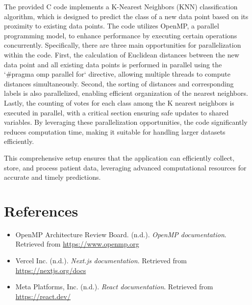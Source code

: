 \documentclass[a4paper,12pt]{report}
\begin{document}
The provided C code implements a K-Nearest Neighbors (KNN) classification algorithm, which is designed to predict the class of a new data point based on its proximity to existing data points. The code utilizes OpenMP, a parallel programming model, to enhance performance by executing certain operations concurrently. Specifically, there are three main opportunities for parallelization within the code. First, the calculation of Euclidean distances between the new data point and all existing data points is performed in parallel using the `\#pragma omp parallel for` directive, allowing multiple threads to compute distances simultaneously. Second, the sorting of distances and corresponding labels is also parallelized, enabling efficient organization of the nearest neighbors. Lastly, the counting of votes for each class among the K nearest neighbors is executed in parallel, with a critical section ensuring safe updates to shared variables. By leveraging these parallelization opportunities, the code significantly reduces computation time, making it suitable for handling larger datasets efficiently.

This comprehensive setup ensures that the application can efficiently collect, store, and process patient data, leveraging advanced computational resources for accurate and timely predictions.

\chapter{References}
\begin{itemize}
    \item OpenMP Architecture Review Board. (n.d.). \textit{OpenMP documentation}. Retrieved from \url{https://www.openmp.org}
    \item Vercel Inc. (n.d.). \textit{Next.js documentation}. Retrieved from \url{https://nextjs.org/docs}
    \item Meta Platforms, Inc. (n.d.). \textit{React documentation}. Retrieved from \url{https://react.dev/}
\end{itemize}
\end{document}
